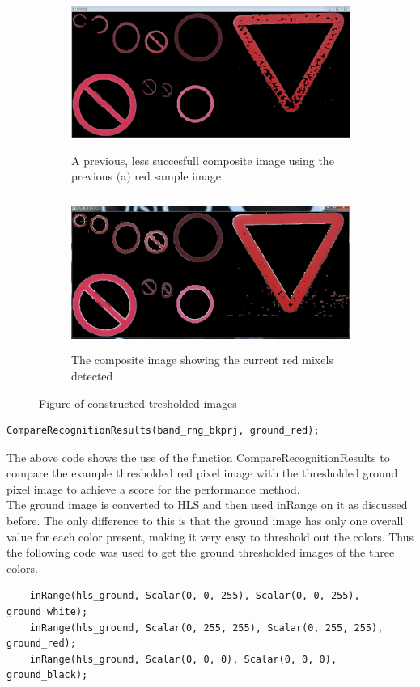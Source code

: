 \documentclass{article}
\begin{document}
\begin{figure}[H]
\begin{subfigure}{0.5\textwidth}
\includegraphics[width=0.9\linewidth, height=5cm]{CROPP.PNG} 
\caption{A previous, less succesfull composite image using the previous $($a$)$ red sample image}
\label{fig:subim1}
\end{subfigure}
\begin{subfigure}{0.5\textwidth}
\includegraphics[width=0.9\linewidth, height=5cm]{N_RED_CROP.PNG}
\caption{The composite image showing the current red mixels detected}
\label{fig:subim2}
\end{subfigure}
\caption{Figure of constructed tresholded images}
\label{fig:image2}
\end{figure}




\begin{lstlisting}
CompareRecognitionResults(band_rng_bkprj, ground_red);
\end{lstlisting}
The above code shows the use of the function CompareRecognitionResults to compare the example thresholded red pixel image with the thresholded ground pixel image to achieve a score for the performance method. \\
The ground image is converted to HLS and then used inRange on it as discussed before. The only difference to this is that the ground image has only one overall value for each color present, making it very easy to threshold out the colors. Thus the following code was used to get the ground thresholded images of the three colors.
\begin{lstlisting}
	inRange(hls_ground, Scalar(0, 0, 255), Scalar(0, 0, 255), ground_white);
	inRange(hls_ground, Scalar(0, 255, 255), Scalar(0, 255, 255), ground_red);
	inRange(hls_ground, Scalar(0, 0, 0), Scalar(0, 0, 0), ground_black);
\end{lstlisting}
\end{document}
